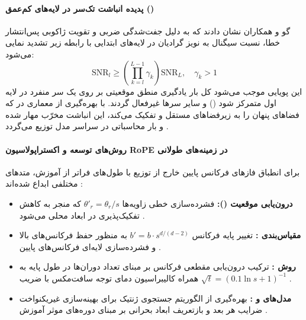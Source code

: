 \paragraph*{پدیده انباشت تک‌سر در لایه‌های کم‌عمق ()}
گو و همکاران \cite{gu2026deconstructing} نشان دادند که به دلیل جفت‌شدگی ضربی و تقویت ژاکوبی پس‌انتشار خطا، نسبت سیگنال به نویز گرادیان در لایه‌های ابتدایی با رابطه زیر تشدید نمایی می‌شود:
\begin{equation}
    \text{SNR}_l \ge \left( \prod_{k=l}^{L-1} \gamma_k \right) \text{SNR}_L, \quad \gamma_k > 1
\end{equation}
این پویایی موجب می‌شود کل بار یادگیری منطق موقعیتی بر روی یک سر منفرد در لایه اول متمرکز شود () و سایر سرها غیرفعال گردند. با بهره‌گیری از معماری  در  که فضاهای پنهان را به زیرفضاهای مستقل  و  تفکیک می‌کند، این انباشت مخرّب مهار شده و بار محاسباتی در سراسر مدل توزیع می‌گردد \cite{gu2026deconstructing, jiguo2026position}.

\paragraph*{روش‌های توسعه و اکستراپولاسیون RoPE در زمینه‌های طولانی}
برای انطباق فازهای فرکانس پایین خارج از توزیع با طول‌های فراتر از آموزش، متدهای مختلفی ابداع شده‌اند \cite{jiguo2026position, liu2025survey}:
\begin{itemize}
    \item \textbf{درون‌یابی موقعیت ():} فشرده‌سازی خطی زاویه‌ها $\theta'_r = \theta_r / s$ که منجر به کاهش تفکیک‌پذیری در ابعاد محلی می‌شود \cite{chen2023extending}.
    \item \textbf{مقیاس‌بندی :} تغییر پایه فرکانس $b' = b \cdot s^{d/(d-2)}$ به منظور حفظ فرکانس‌های بالا و فشرده‌سازی لایه‌ای فرکانس‌های پایین \cite{jiguo2026position}.
    \item \textbf{روش :} ترکیب درون‌یابی مقطعی فرکانس بر مبنای تعداد دوران‌ها در طول پایه به همراه کالیبراسیون دمای توجه سافت‌مکس با ضریب $\sqrt{t} = (0.1 \ln s + 1)^{-1}$ \cite{peng2024yarn}.
    \item \textbf{مدل‌های  و :} بهره‌گیری از الگوریتم جستجوی ژنتیک برای بهینه‌سازی غیریکنواخت ضرایب هر بعد و بازتعریف ابعاد بحرانی بر مبنای دوره‌های موثر آموزش \cite{ding2024longrope, shang2025longrope2}.
\end{itemize}

